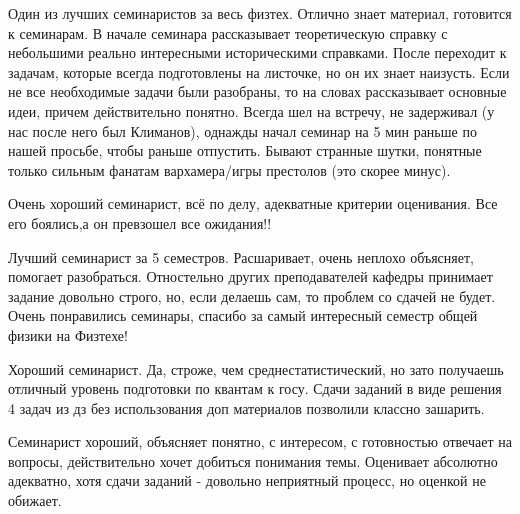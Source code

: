                 \begin{commentbox} 
                    Один из лучших семинаристов за весь физтех. Отлично знает материал, готовится к семинарам. В начале семинара рассказывает теоретическую справку с небольшими реально интересными историческими справками. После переходит к задачам, которые всегда подготовлены на листочке, но он их знает наизусть. Если не все необходимые задачи были разобраны, то на словах рассказывает основные идеи, причем действительно понятно. Всегда шел на встречу,  не задерживал (у нас после него был Климанов), однажды начал семинар на 5 мин раньше по нашей просьбе, чтобы раньше отпустить. Бывают странные шутки, понятные только сильным фанатам вархамера/игры престолов (это скорее минус). 
                \end{commentbox} 
            
                \begin{commentbox} 
                    Очень хороший семинарист, всё по делу, адекватные критерии оценивания. Все его боялись,а он превзошел все ожидания!! 
                \end{commentbox} 
            
                \begin{commentbox} 
                    Лучший семинарист за 5 семестров. Расшаривает, очень неплохо объясняет, помогает разобраться. Отностельно других преподавателей кафедры принимает задание довольно строго, но, если делаешь сам, то проблем со сдачей не будет. Очень понравились семинары, спасибо за самый интересный семестр общей физики на Физтехе! 
                \end{commentbox} 
            
                \begin{commentbox} 
                    Хороший семинарист. Да, строже, чем среднестатистический, но зато получаешь отличный уровень подготовки по квантам к госу. Сдачи заданий в виде решения 4 задач из дз без использования доп материалов позволили классно зашарить. 
                \end{commentbox} 
            
                \begin{commentbox} 
                    Семинарист хороший, объясняет понятно, с интересом, с готовностью отвечает на вопросы, действительно хочет добиться понимания темы. Оценивает абсолютно адекватно, хотя сдачи заданий - довольно неприятный процесс, но оценкой не обижает.
                \end{commentbox} 


